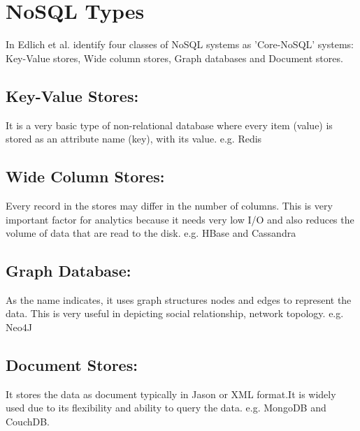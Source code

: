 \documentclass[sigconf]{acmart}
\begin{document}
\section{NoSQL Types}
In \cite{edmodel} Edlich et al. identify four classes of NoSQL systems as 'Core-NoSQL' systems: Key-Value stores, Wide column stores, Graph databases and Document stores.	

\subsection{Key-Value Stores:} It is a very basic type of non-relational database where every item (value) is stored as an attribute name (key), with its value. e.g. Redis

\subsection{Wide Column Stores:} Every record in the stores may differ in the number of columns. This is very important factor for analytics because it needs very low I/O and also reduces the volume of data that are read to the disk. e.g. HBase and Cassandra

\subsection{Graph Database:} As the name indicates, it uses graph structures nodes and edges to represent the data. This is very useful in depicting social relationship, network topology. e.g. Neo4J 

\subsection{Document Stores: }It stores the data as document typically in Jason or XML format.It is widely used due to its flexibility and ability to query the data. e.g. MongoDB and CouchDB.
\end{document}
